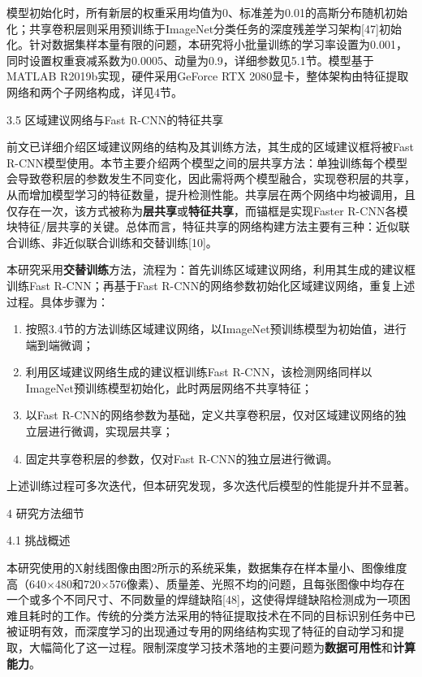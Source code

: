 模型初始化时，所有新层的权重采用均值为0、标准差为0.01的高斯分布随机初始化；共享卷积层则采用预训练于ImageNet分类任务的深度残差学习架构{[}47{]}初始化。针对数据集样本量有限的问题，本研究将小批量训练的学习率设置为0.001，同时设置权重衰减系数为0.0005、动量为0.9，详细参数见5.1节。模型基于MATLAB
R2019b实现，硬件采用GeForce RTX
2080显卡，整体架构由特征提取网络和两个子网络构成，详见4节。

3.5 区域建议网络与Fast R-CNN的特征共享

前文已详细介绍区域建议网络的结构及其训练方法，其生成的区域建议框将被Fast
R-CNN模型使用。本节主要介绍两个模型之间的层共享方法：单独训练每个模型会导致卷积层的参数发生不同变化，因此需将两个模型融合，实现卷积层的共享，从而增加模型学习的特征数量，提升检测性能。共享层在两个网络中均被调用，且仅存在一次，该方式被称为\textbf{层共享}或\textbf{特征共享}，而锚框是实现Faster
R-CNN各模块特征/层共享的关键。总体而言，特征共享的网络构建方法主要有三种：近似联合训练、非近似联合训练和交替训练{[}10{]}。

本研究采用\textbf{交替训练}方法，流程为：首先训练区域建议网络，利用其生成的建议框训练Fast
R-CNN；再基于Fast
R-CNN的网络参数初始化区域建议网络，重复上述过程。具体步骤为：

\begin{enumerate}
	\def\labelenumi{\arabic{enumi}.}
	\item
	按照3.4节的方法训练区域建议网络，以ImageNet预训练模型为初始值，进行端到端微调；
	\item
	利用区域建议网络生成的建议框训练Fast
	R-CNN，该检测网络同样以ImageNet预训练模型初始化，此时两层网络不共享特征；
	\item
	以Fast
	R-CNN的网络参数为基础，定义共享卷积层，仅对区域建议网络的独立层进行微调，实现层共享；
	\item
	固定共享卷积层的参数，仅对Fast R-CNN的独立层进行微调。
\end{enumerate}

上述训练过程可多次迭代，但本研究发现，多次迭代后模型的性能提升并不显著。

4 研究方法细节

4.1 挑战概述

本研究使用的X射线图像由图2所示的系统采集，数据集存在样本量小、图像维度高（640×480和720×576像素）、质量差、光照不均的问题，且每张图像中均存在一个或多个不同尺寸、不同数量的焊缝缺陷{[}48{]}，这使得焊缝缺陷检测成为一项困难且耗时的工作。传统的分类方法采用的特征提取技术在不同的目标识别任务中已被证明有效，而深度学习的出现通过专用的网络结构实现了特征的自动学习和提取，大幅简化了这一过程。限制深度学习技术落地的主要问题为\textbf{数据可用性}和\textbf{计算能力}。

